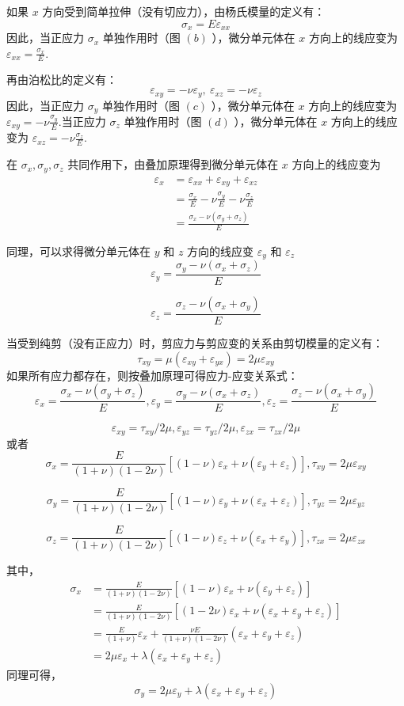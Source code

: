 \documentclass[12pt,a4paper]{article}
\begin{document}
如果 $x$ 方向受到简单拉伸（没有切应力），由杨氏模量的定义有：
$$
\sigma_x=E\varepsilon_{xx}
$$
因此，当正应力 $\sigma_x$ 单独作用时（图 $(b)$ ），微分单元体在 $x$ 方向上的线应变为 $\varepsilon_{xx}=\frac{\sigma_x}{E}$.

再由泊松比的定义有：
$$
\varepsilon_{xy}=-\nu\varepsilon_y,~\varepsilon_{xz}=-\nu\varepsilon_z
$$
因此，当正应力 $\sigma_y$ 单独作用时（图 $(c)$ ），微分单元体在 $x$ 方向上的线应变为 $\varepsilon_{xy}=-\nu\frac{\sigma_y}{E}$.当正应力 $\sigma_z$ 单独作用时（图 $(d)$ ），微分单元体在 $x$ 方向上的线应变为 $\varepsilon_{xz}=-\nu\frac{\sigma_z}{E}$.

在 $\sigma_x,\sigma_y,\sigma_z$ 共同作用下，由叠加原理得到微分单元体在 $x$ 方向上的线应变为
\begin{align}
\varepsilon_x & =\varepsilon_{xx}+\varepsilon_{xy}+\varepsilon_{xz} \\
& =\frac{\sigma_x}{E}-\nu\frac{\sigma_y}{E}-\nu\frac{\sigma_z}{E} \\
& =\frac{\sigma_x-\nu(\sigma_y+\sigma_z)}{E}
\end{align}

同理，可以求得微分单元体在 $y$ 和 $z$ 方向的线应变 $\varepsilon_y$ 和 $\varepsilon_z$
$$
\varepsilon_y=\frac{\sigma_y-\nu(\sigma_x+\sigma_z)}{E}
$$

$$
\varepsilon_z=\frac{\sigma_z-\nu(\sigma_x+\sigma_y)}{E}
$$

当受到纯剪（没有正应力）时，剪应力与剪应变的关系由剪切模量的定义有：
$$
\tau_{xy}=\mu(\varepsilon_{xy}+\varepsilon_{yx})=2\mu\varepsilon_{xy}
$$
如果所有应力都存在，则按叠加原理可得应力-应变关系式：
$$
\varepsilon_x=\frac{\sigma_x-\nu(\sigma_y+\sigma_z)}{E},\varepsilon_y=\frac{\sigma_y-\nu(\sigma_x+\sigma_z)}{E},\varepsilon_z=\frac{\sigma_z-\nu(\sigma_x+\sigma_y)}{E}
$$

$$
\varepsilon_{xy}=\tau_{xy}/2\mu,\varepsilon_{yz}=\tau_{yz}/2\mu,\varepsilon_{zx}=\tau_{zx}/2\mu
$$
或者
$$
\sigma_x=\frac{E}{(1+\nu)(1-2\nu)}[(1-\nu)\varepsilon_x+\nu(\varepsilon_y+\varepsilon_z)],\tau_{xy}=2\mu\varepsilon_{xy}
$$

$$
\sigma_y=\frac{E}{(1+\nu)(1-2\nu)}[(1-\nu)\varepsilon_y+\nu(\varepsilon_x+\varepsilon_z)],\tau_{yz}=2\mu\varepsilon_{yz}
$$

$$
\sigma_z=\frac{E}{(1+\nu)(1-2\nu)}[(1-\nu)\varepsilon_z+\nu(\varepsilon_x+\varepsilon_y)],\tau_{zx}=2\mu\varepsilon_{zx}
$$

其中，
\begin{align}
\sigma_x & =\frac{E}{(1+\nu)(1-2\nu)}[(1-\nu)\varepsilon_x+\nu(\varepsilon_y+\varepsilon_z)]\\
& =\frac{E}{(1+\nu)(1-2\nu)}[(1-2\nu)\varepsilon_x+\nu(\varepsilon_x+\varepsilon_y+\varepsilon_z)] \\
& =\frac{E}{(1+\nu)}\varepsilon_x+\frac{\nu E}{(1+\nu)(1-2\nu)}(\varepsilon_x+\varepsilon_y+\varepsilon_z) \\
& =2\mu\varepsilon_x+\lambda(\varepsilon_x+\varepsilon_y+\varepsilon_z)
\end{align}
同理可得，
$$
\sigma_y=2\mu\varepsilon_y+\lambda(\varepsilon_x+\varepsilon_y+\varepsilon_z)
$$
\end{document}
